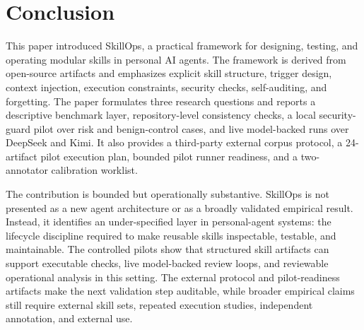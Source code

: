 \documentclass[11pt]{article}
\begin{document}
\section{Conclusion}

This paper introduced SkillOps, a practical framework for designing, testing,
and operating modular skills in personal AI agents. The framework is derived
from open-source artifacts and emphasizes explicit skill structure, trigger
design, context injection, execution constraints, security checks,
self-auditing, and forgetting. The paper formulates three research questions
and reports a descriptive benchmark layer, repository-level consistency checks,
a local security-guard pilot over risk and benign-control cases, and live
model-backed runs over DeepSeek and Kimi. It also provides a third-party
external corpus protocol, a 24-artifact pilot execution plan, bounded pilot
runner readiness, and a two-annotator calibration worklist.

The contribution is bounded but operationally substantive. SkillOps is not
presented as a new agent architecture or as a broadly validated empirical
result. Instead, it identifies an under-specified layer in personal-agent
systems: the lifecycle discipline required to make reusable skills inspectable,
testable, and maintainable. The controlled pilots show that structured skill
artifacts can support executable checks, live model-backed review loops, and
reviewable operational analysis in this setting. The external protocol and
pilot-readiness artifacts make the next validation step auditable, while
broader empirical claims still require external skill sets, repeated execution
studies, independent annotation, and external use.



\end{document}
